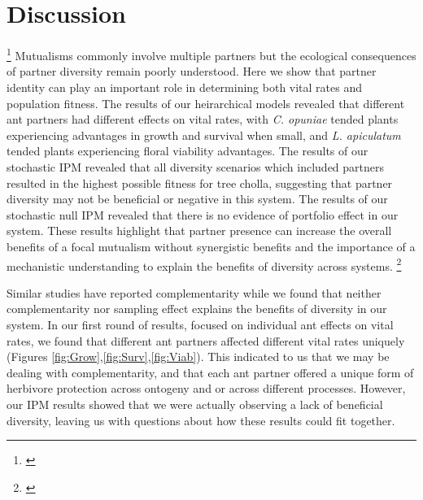 \documentclass[11pt]{article}
\newcommand{\ali}[2]{{\color{blue}{#1}}\footnote{\textit{\color{blue}{#2}}}}
\begin{document}
\section*{Discussion}\ali{}{I am struggling reframing this part. I think I may need to start with a new outline, because a lot of what we had doesn't apply to our new conclusions that mutualism is good but we don't see a benefit of partner diversity?}
Mutualisms commonly involve multiple partners but the ecological consequences of partner diversity remain poorly understood. 
Here we show that partner identity can play an important role in determining both vital rates and population fitness. 
The results of our heirarchical models revealed that different ant partners had different effects on vital rates, with \textit{C. opuniae} tended plants experiencing advantages in growth and survival when small, and \textit{L. apiculatum} tended plants experiencing floral viability advantages.
The results of our stochastic IPM revealed that all diversity scenarios which included partners resulted in the highest possible fitness for tree cholla, suggesting that partner diversity may not be beneficial or negative in this system. 
The results of our stochastic null IPM revealed that there is no evidence of portfolio effect in our system. 
These results highlight that partner presence can increase the overall benefits of a focal mutualism without synergistic benefits and the importance of a mechanistic understanding to explain the benefits of diversity across systems. \ali{}{This may not be great, but I am struggling a bit with this framing}

Similar studies have reported complementarity \citep{Palmer2010,Rezende2007,Hooper2005,Cardinale2007,Afkhami2021} while we found that neither complementarity nor sampling effect explains the benefits of diversity in our system. 
In our first round of results, focused on individual ant effects on vital rates, we found that different ant partners affected different vital rates uniquely (Figures \ref{fig:Grow},\ref{fig:Surv},\ref{fig:Viab}).
This indicated to us that we may be dealing with complementarity, and that each ant partner offered a unique form of herbivore protection across ontogeny and or across different processes. 
However, our IPM results showed that we were actually observing a lack of beneficial diversity, leaving us with questions about how these results could fit together. 
\end{document}
